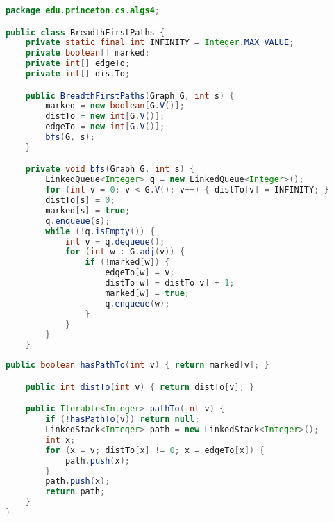\documentclass[8pt,a4paper,compress]{beamer}
\begin{document}
\begin{frame}[fragile]
\pause

\begin{lstlisting}[language=java,style=focusin]
package edu.princeton.cs.algs4;

public class BreadthFirstPaths {
    private static final int INFINITY = Integer.MAX_VALUE;
    private boolean[] marked; 
    private int[] edgeTo; 
    private int[] distTo;   

    public BreadthFirstPaths(Graph G, int s) {
        marked = new boolean[G.V()];
        distTo = new int[G.V()];
        edgeTo = new int[G.V()];
        bfs(G, s);
    }

    private void bfs(Graph G, int s) {
        LinkedQueue<Integer> q = new LinkedQueue<Integer>();
        for (int v = 0; v < G.V(); v++) { distTo[v] = INFINITY; }
        distTo[s] = 0;
        marked[s] = true;
        q.enqueue(s);
        while (!q.isEmpty()) {
            int v = q.dequeue();
            for (int w : G.adj(v)) {
                if (!marked[w]) {
                    edgeTo[w] = v;
                    distTo[w] = distTo[v] + 1;
                    marked[w] = true;
                    q.enqueue(w);
                }
            }
        }
    }
\end{lstlisting}
\end{frame}

\begin{frame}[fragile]
\pause

\begin{lstlisting}[language=java,style=focusin]
    public boolean hasPathTo(int v) { return marked[v]; }

    public int distTo(int v) { return distTo[v]; }

    public Iterable<Integer> pathTo(int v) {
        if (!hasPathTo(v)) return null;
        LinkedStack<Integer> path = new LinkedStack<Integer>();
        int x;
        for (x = v; distTo[x] != 0; x = edgeTo[x]) {
            path.push(x);
        }
        path.push(x);
        return path;
    }
}
\end{lstlisting}
\end{frame}

\begin{frame}[fragile]
\pause

Trace
\begin{center}
}
\end{center}
\end{frame}
\end{document}
